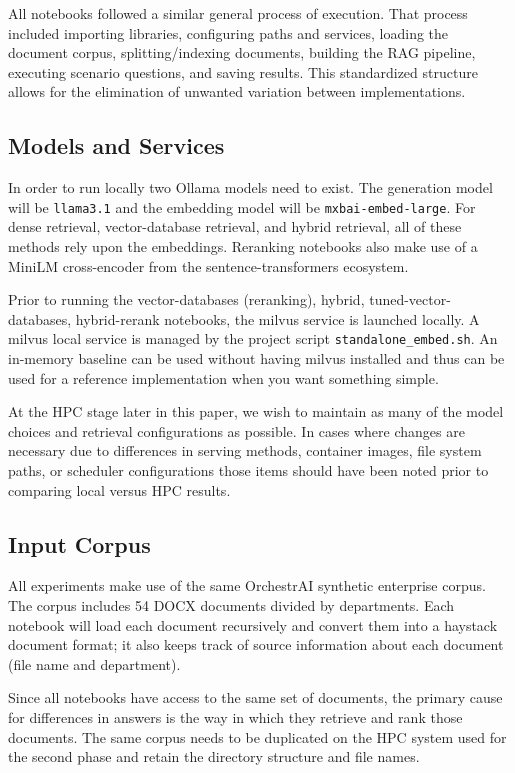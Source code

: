 All notebooks followed a similar general process of execution. That process included importing libraries, configuring paths and services, loading the document corpus, splitting/indexing documents, building the RAG pipeline, executing scenario questions, and saving results. This standardized structure allows for the elimination of unwanted variation between implementations.

\subsection{Models and Services}
In order to run locally two Ollama models need to exist. The generation model will be \texttt{llama3.1} and the embedding model will be \texttt{mxbai-embed-large}. For dense retrieval, vector-database retrieval, and hybrid retrieval, all of these methods rely upon the embeddings. Reranking notebooks also make use of a MiniLM cross-encoder from the sentence-transformers ecosystem.

Prior to running the vector-databases (reranking), hybrid, tuned-vector-databases, hybrid-rerank notebooks, the milvus service is launched locally. A milvus local service is managed by the project script \texttt{standalone\_\allowbreak embed.sh}. An in-memory baseline can be used without having milvus installed and thus can be used for a reference implementation when you want something simple.

At the HPC stage later in this paper, we wish to maintain as many of the model choices and retrieval configurations as possible. In cases where changes are necessary due to differences in serving methods, container images, file system paths, or scheduler configurations those items should have been noted prior to comparing local versus HPC results.

\subsection{Input Corpus}
All experiments make use of the same OrchestrAI synthetic enterprise corpus. The corpus includes 54 DOCX documents divided by departments. Each notebook will load each document recursively and convert them into a haystack document format; it also keeps track of source information about each document (file name and department).

Since all notebooks have access to the same set of documents, the primary cause for differences in answers is the way in which they retrieve and rank those documents. The same corpus needs to be duplicated on the HPC system used for the second phase and retain the directory structure and file names.

